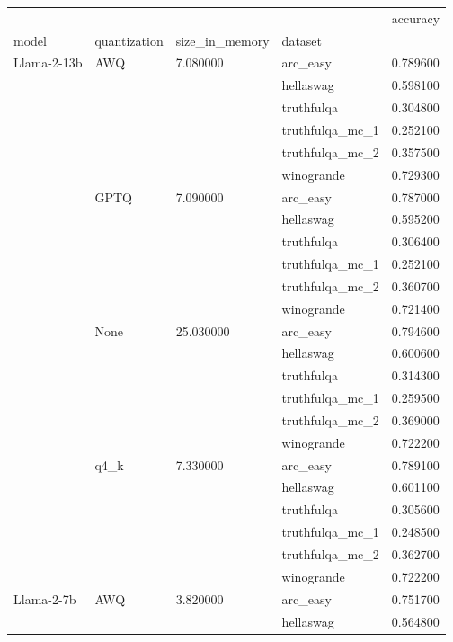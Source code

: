 \begin{tabular}{lllll}
\toprule
 &  &  &  & accuracy \\
model & quantization & size\_in\_memory & dataset &  \\
\midrule
\multirow[t]{24}{*}{Llama-2-13b} & \multirow[t]{6}{*}{AWQ} & \multirow[t]{6}{*}{7.080000} & arc\_easy & 0.789600 \\
 &  &  & hellaswag & 0.598100 \\
 &  &  & truthfulqa & 0.304800 \\
 &  &  & truthfulqa\_mc\_1 & 0.252100 \\
 &  &  & truthfulqa\_mc\_2 & 0.357500 \\
 &  &  & winogrande & 0.729300 \\
\cline{2-5} \cline{3-5}
 & \multirow[t]{6}{*}{GPTQ} & \multirow[t]{6}{*}{7.090000} & arc\_easy & 0.787000 \\
 &  &  & hellaswag & 0.595200 \\
 &  &  & truthfulqa & 0.306400 \\
 &  &  & truthfulqa\_mc\_1 & 0.252100 \\
 &  &  & truthfulqa\_mc\_2 & 0.360700 \\
 &  &  & winogrande & 0.721400 \\
\cline{2-5} \cline{3-5}
 & \multirow[t]{6}{*}{None} & \multirow[t]{6}{*}{25.030000} & arc\_easy & 0.794600 \\
 &  &  & hellaswag & 0.600600 \\
 &  &  & truthfulqa & 0.314300 \\
 &  &  & truthfulqa\_mc\_1 & 0.259500 \\
 &  &  & truthfulqa\_mc\_2 & 0.369000 \\
 &  &  & winogrande & 0.722200 \\
\cline{2-5} \cline{3-5}
 & \multirow[t]{6}{*}{q4\_k} & \multirow[t]{6}{*}{7.330000} & arc\_easy & 0.789100 \\
 &  &  & hellaswag & 0.601100 \\
 &  &  & truthfulqa & 0.305600 \\
 &  &  & truthfulqa\_mc\_1 & 0.248500 \\
 &  &  & truthfulqa\_mc\_2 & 0.362700 \\
 &  &  & winogrande & 0.722200 \\
\cline{1-5} \cline{2-5} \cline{3-5}
\multirow[t]{38}{*}{Llama-2-7b} & \multirow[t]{6}{*}{AWQ} & \multirow[t]{6}{*}{3.820000} & arc\_easy & 0.751700 \\
 &  &  & hellaswag & 0.564800 \\

\end{tabular}
